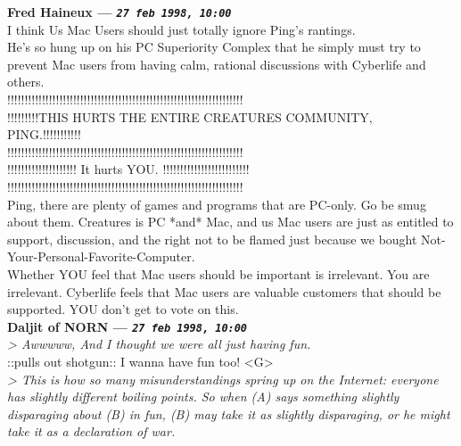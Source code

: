 \documentclass[11pt,twoside,a4paper]{article}
\begin{document}
\begin{multicols*}{2}
\textbf{Fred Haineux --- \emph{\texttt{27 feb 1998, 10:00}}}~\\

I think Us Mac Users should just totally ignore Ping's rantings.~\\

He's so hung up on his PC Superiority Complex that he simply must try to prevent Mac users from having calm, rational discussions with Cyberlife and others.~\\

!!!!!!!!!!!!!!!!!!!!!!!!!!!!!!!!!!!!!!!!!!!!!!!!!!!!!!!!!!!!!!!!!!!!~\\
!!!!!!!!!THIS HURTS THE ENTIRE CREATURES COMMUNITY, PING.!!!!!!!!!!!~\\
!!!!!!!!!!!!!!!!!!!!!!!!!!!!!!!!!!!!!!!!!!!!!!!!!!!!!!!!!!!!!!!!!!!!~\\
!!!!!!!!!!!!!!!!!!!!     It hurts YOU.     !!!!!!!!!!!!!!!!!!!!!!!!!~\\
!!!!!!!!!!!!!!!!!!!!!!!!!!!!!!!!!!!!!!!!!!!!!!!!!!!!!!!!!!!!!!!!!!!!~\\

Ping, there are plenty of games and programs that are PC-only. Go be smug about them. Creatures is PC *and* Mac, and us Mac users are just as entitled to support, discussion, and the right not to be flamed just because we bought Not-Your-Personal-Favorite-Computer.~\\

Whether YOU feel that Mac users should be important is irrelevant. You are irrelevant. Cyberlife feels that Mac users are valuable customers that should be supported. YOU don't get to vote on this.~\\

 
		
	
		
\textbf{Daljit of NORN --- \emph{\texttt{27 feb 1998, 10:00}}}~\\

\emph{> Awwwww, And I thought we were all just having fun.}~\\

::pulls out shotgun::  I wanna have fun too!  <G>~\\

\emph{> This is how so many misunderstandings spring up on the Internet: everyone has slightly different boiling points. So when (A) says something slightly disparaging about (B) in fun, (B) may take it as slightly disparaging, or he might take it as a declaration of war.}~\\


\end{multicols*}
\end{document}
